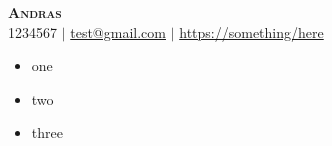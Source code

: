 \documentclass[letterpaper,11pt]{article}
\begin{document}
\begin{center}
    \textbf{\Huge \scshape \color{TextColor} Andras} \\ \vspace{1pt}
    \small 1234567 $|$ \href{mailto:test@gmail.com}{test@gmail.com} $|$
    \href{https://https://something/here}{https://something/here}
\end{center}
\begin{itemize}
        \item {one}
        \item {two}
        \item {three}
    \end{itemize}
\end{document}
